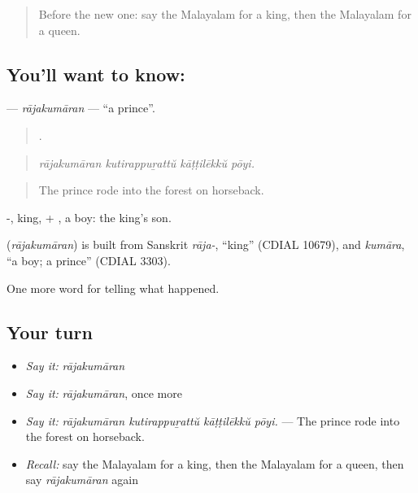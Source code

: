 \label{lesson:ML-C397-rajakumaran}



\begin{quote}
Before the new one: say the Malayalam for a king, then the Malayalam for a queen.
\end{quote}

\subsection*{You'll want to know: }
\textbf{} — \emph{rājakumāran} — \textquotedblleft{}a prince\textquotedblright{}.

\begin{quote}
   .
\end{quote}

\begin{quote}
\emph{rājakumāran kutirappuṟattŭ kāṭṭilēkkŭ pōyi.}
\end{quote}

\begin{quote}
The prince rode into the forest on horseback.
\end{quote}

-, king, + , a boy: the king's son.

\begin{cousinweb}
\textbf{} (\emph{rājakumāran}) is built from Sanskrit \emph{rāja-}, \textquotedblleft{}king\textquotedblright{} (CDIAL 10679), and \emph{kumāra}, \textquotedblleft{}a boy; a prince\textquotedblright{} (CDIAL 3303).
\end{cousinweb}

\begin{grammarlens}[title={What you've built}]
One more word for telling what happened.
\end{grammarlens}

\subsection*{Your turn}
\begin{itemize}
\raggedright
  \item \emph{Say it:} \emph{rājakumāran}
  \item \emph{Say it:} \emph{rājakumāran}, once more
  \item \emph{Say it:} \emph{rājakumāran kutirappuṟattŭ kāṭṭilēkkŭ pōyi.} — The prince rode into the forest on horseback.
  \item \emph{Recall:} say the Malayalam for a king, then the Malayalam for a queen, then say \emph{rājakumāran} again
\end{itemize}


